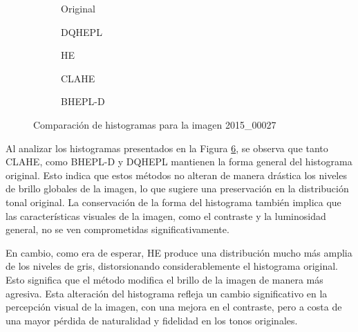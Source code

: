 \documentclass[sigchi]{acmart}
\begin{document}
\begin{figure}[htbp]
	\centering
	\begin{subfigure}[b]{0.45\textwidth}
		\resizebox{\linewidth}{!}{}
		\caption{Original}
		\label{fig:original_3}
	\end{subfigure}
	\hfill
	\begin{subfigure}[b]{0.45\textwidth}
		\resizebox{\linewidth}{!}{}
		\caption{DQHEPL}
		\label{fig:dqhepl_3}
	\end{subfigure}

	\begin{subfigure}[b]{0.45\textwidth}
		\resizebox{\linewidth}{!}{}
		\caption{HE}
		\label{fig:he_3}
	\end{subfigure}
	\hfill
	\begin{subfigure}[b]{0.45\textwidth}
		\resizebox{\linewidth}{!}{}
		\caption{CLAHE}
		\label{fig:clahe_3}
	\end{subfigure}

	\centering
	\begin{subfigure}[b]{0.45\textwidth}
		\resizebox{\linewidth}{!}{}
		\caption{BHEPL-D}
		\label{fig:bhepl_3}
	\end{subfigure}

	\caption{Comparación de histogramas para la imagen 2015\_00027}
	\label{fig:histogramas_3}
\end{figure}

Al analizar los histogramas presentados en la Figura \ref{fig:histogramas_3}, se observa que
tanto CLAHE, como BHEPL-D y DQHEPL mantienen la forma general del histograma original. Esto
indica que estos métodos no alteran de manera drástica los niveles de brillo globales de la
imagen, lo que sugiere una preservación en la distribución tonal original. La conservación de
la forma del histograma también implica que las características visuales de la imagen, como el
contraste y la luminosidad general, no se ven comprometidas significativamente.

En cambio, como era de esperar, HE produce una distribución mucho más amplia de los niveles de
gris, distorsionando considerablemente el histograma original. Esto significa que el método
modifica el brillo de la imagen de manera más agresiva. Esta alteración del histograma refleja
un cambio significativo en la percepción visual de la imagen, con una mejora en el contraste,
pero a costa de una mayor pérdida de naturalidad y fidelidad en los tonos originales.
\end{document}
